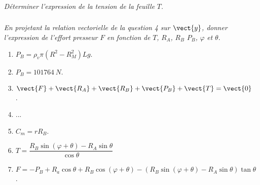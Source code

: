 \subparagraph{}
\textit{Déterminer l'expression de la tension de la feuille $T$.}
\ifprof
\begin{corrige}
\end{corrige}
\else
\fi


\subparagraph{}
\textit{En projetant la relation vectorielle de la question 4 sur $\vect{y}$, donner l'expression de l'effort presseur $F$ en fonction de $T$, $R_A$, $R_B$ $P_B$, $\varphi$ et $\theta$.}
\ifprof
\begin{corrige}
\end{corrige}
\else
\fi


\begin{enumerate}
\item $P_B = \rho_v \pi \left(R^2 - R_M^2 \right)Lg$.
\item $P_B = \SI{101764}{N}$.
\item $\vect{F}+\vect{R_A}+\vect{R_B}+\vect{P_B}+\vect{T}=\vect{0}$.
\item ...
\item $C_m = rR_B$.
\item $T = \dfrac{R_B \sin \left( \varphi+ \theta \right)- R_A \sin\theta }{\cos \theta }$ 
\item $F=-P_B + R_a \cos \theta + R_B \cos \left( \varphi + \theta \right) - \left( R_B \sin  \left( \varphi + \theta \right)-R_A \sin \theta \right) \tan \theta$.
\end{enumerate}
